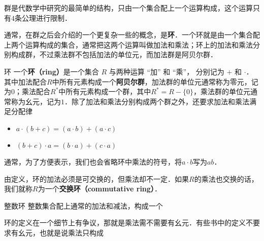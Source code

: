 

群是代数学中研究的最简单的结构，只由一个集合配上一个运算构成，这个运算只有$4$条公理进行限制．

通常，在群之后会介绍的一个更复杂一些的概念，是\textbf{环}．一个环就是由一个集合配上两个运算构成的集合，通常把这两个运算叫做加法和乘法；环上的加法和乘法分别构成群，不过乘法群不包括加法的单位元，而加法群是阿贝尔群．

\begin{definition}{环}
一个\textbf{环（ring）}是一个集合 $R$ 与两种运算 “加” 和 “乘”， 分别记为 $+$ 和 $\cdot$． 其中加法配合$R$中所有元素构成一个\textbf{阿贝尔群}，加法群的单位元通常称为零元，记为$0$；乘法配合$R^*$中所有元素构成一个群，其中$R^*=R-\{0\}$，乘法群的单位元通常称为幺元，记为$1$．除了加法和乘法分别构成两个群之外，还要求加法和乘法满足分配律
\begin{itemize}
\item $a \cdot (b + c) = (a \cdot b) + (a \cdot c)$
\item $(b + c) \cdot a = (b \cdot a) + (c \cdot a)$
\end{itemize}
\end{definition}

通常，为了方便表示，我们也会省略环中乘法的符号，将$a\cdot b$写为$ab$．

由定义，环的加法必须是可交换的，但乘法却不一定．如果$R$的乘法也交换的话，我们就称$R$为一个\textbf{交换环（commutative ring）}．

\begin{example}{整数环}
整数集合配上通常的加法和减法，构成一个
\end{example}

环的定义在一个细节上有争议，那就是乘法需不需要有幺元．有些书中的定义不要求有幺元，也就是说乘法只构成
